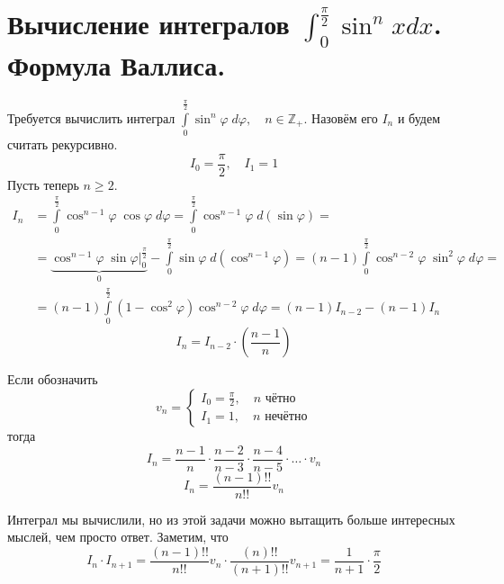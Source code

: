 \documentclass[../main.tex]{subfiles}
\begin{document}
\newpage
\section{Вычисление интегралов \( \int_{ 0}^{ \frac{ \pi}{ 2}} \sin^n xdx\). Формула Валлиса.}
Требуется вычислить интеграл \( \displaystyle\int\limits_{ 0}^{ \frac{ \pi}{ 2}} \sin^n \varphi \;d \varphi ,\quad n \in \mathbb{Z}_+\). Назовём его \( I_n\) и будем считать рекурсивно. 
\[ I_0= \dfrac{ \pi}{ 2} ,\quad I_1=1\]
Пусть теперь \( n \geq 2\).
\begin{equation*}
    \begin{aligned}
        I_n&= \displaystyle\int\limits_{ 0}^{ \frac{ \pi}{ 2}  } \cos ^{n-1} \varphi \; \cos \varphi \; d \varphi = \displaystyle\int\limits_{ 0}^{ \frac{ \pi}{ 2}  } \cos ^{n-1} \varphi \; d\left( \sin \varphi \right)=\\
        &=\underbrace{\cos^{n-1} \varphi \; \sin \varphi |_0^{ \frac{ \pi}{ 2}}}_0 - \displaystyle\int\limits_{ 0}^{ \frac{ \pi}{ 2}  } \sin \varphi \; d\left( \cos ^{n-1} \varphi \right)=\left( n-1\right) \displaystyle\int\limits_{ 0}^{ \frac{ \pi}{ 2}  } \cos ^{n-2} \varphi \; \sin^2 \varphi \;d \varphi =\\ 
        &=\left( n-1\right) \displaystyle\int\limits_{ 0}^{ \frac{ \pi}{ 2}  } \left( 1- \cos^2 \varphi \right)\cos^{n-2} \varphi \; d \varphi = \left( n-1\right) I_{n-2} - \left( n-1\right)I_n
    \end{aligned}
\end{equation*}
\[ \boxed{I_n= I_{n-2} \cdot \left( \dfrac{ n-1}{ n} \right)}\]

Если обозначить
\begin{equation*}
    v_n=
    \begin{cases}
        I_0= \frac{ \pi}{ 2},\quad n\text{ чётно}\\ 
        I_1=1,\quad n\text{ нечётно} 
    \end{cases}
\end{equation*}
тогда 
\[ I_n= \dfrac{ n-1}{ n} \cdot \dfrac{ n-2}{ n-3} \cdot \dfrac{ n-4}{ n-5} \cdot \ldots \cdot v_n\]
\[ \boxed{I_n= \dfrac{ \left(n-1\right)!!}{ n!!} v_n}\]

Интеграл мы вычислили, но из этой задачи можно вытащить больше интересных мыслей, чем просто ответ. Заметим, что
\[ I_n \cdot I_{n+1}= \dfrac{ \left(n-1\right)!!}{ n!!} v_n \cdot \dfrac{ \left(n\right)!!}{ \left( n+1\right)!!} v_{n+1} =  \dfrac{ 1}{ n+1} \cdot  \dfrac{ \pi}{ 2}  \]
\end{document}
